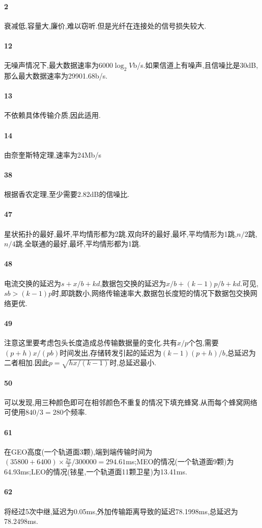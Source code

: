 \documentclass[a4paper]{article}
\begin{document}
\paragraph{2}
衰减低,容量大,廉价,难以窃听.但是光纤在连接处的信号损失较大.
\paragraph{12}
无噪声情况下,最大数据速率为6000$\log_2V$b/s.如果信道上有噪声,且信噪比是30dB,那么最大数据速率为29901.68b/s.
\paragraph{13}
不依赖具体传输介质,因此适用.
\paragraph{14}
由奈奎斯特定理,速率为24Mb/s
\paragraph{38}
根据香农定理,至少需要2.82dB的信噪比.
\paragraph{47}
星状拓扑的最好,最坏,平均情形都为2跳.双向环的最好,最坏,平均情形为1跳,$n/2$跳,$n/4$跳.全联通的最好,最坏,平均情形都为1跳.
\paragraph{48}
电流交换的延迟为$s+x/b+kd$,数据包交换的延迟为$x/b+(k-1)p/b+kd$.可见,$sb>(k-1)p$时,即跳数小,网络传输速率大,数据包长度短的情况下数据包交换网络更优.
\paragraph{49}
注意这里要考虑包头长度造成总传输数据量的变化.共有$x/p$个包,需要$(p+h)x/(pb)$时间发出,存储转发引起的延迟为$(k-1)(p+h)/b$,总延迟为二者相加.因此$p=\sqrt{hx/(k-1)}$时,总延迟最小.
\paragraph{50}
可以发现,用三种颜色即可在相邻颜色不重复的情况下填充蜂窝.从而每个蜂窝网络可使用$840/3=280$个频率.
\paragraph{61}
在GEO高度(一个轨道面3颗),端到端传输时间为$(35800+6400)\times\frac{2\pi}{3}/300000=294.61$ms;MEO的情况(一个轨道面9颗)为64.93ms;LEO的情况(铱星,一个轨道面11颗卫星)为13.41ms.
\paragraph{62}
将经过5次中继,延迟为0.05ms,外加传输距离导致的延迟78.1998ms,总延迟为78.2498ms.
\end{document}
